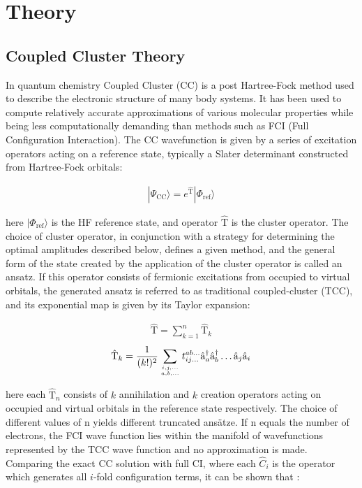 \documentclass[twoside,twocolumn,9pt]{article}
\begin{document}
\section{Theory}

\subsection{Coupled Cluster Theory}

In quantum chemistry Coupled Cluster (CC) \cite{Anand2022} is a post Hartree-Fock method used to describe the electronic structure of many body systems. It has been used to compute relatively accurate approximations of various molecular properties while being less computationally demanding than methods such as FCI (Full Configuration Interaction). The CC wavefunction is given by a series of excitation operators acting on a reference state, typically a Slater determinant constructed from Hartree-Fock orbitals:

\begin{align}
  |\Psi_{\text{CC}}\rangle = e^{\hat{\text{T}}} |\Phi_{\text{ref}}\rangle
\end{align}

here $|\Phi_{\text{ref}}\rangle$ is the HF reference state, and operator $\hat{\text{T}}$ is the cluster operator. The choice of cluster operator, in conjunction with a strategy for determining the optimal amplitudes described below, defines a given method, and the general form of the state created by the application of the cluster operator is called an ansatz. If this operator consists of fermionic excitations from occupied to virtual orbitals, the generated ansatz is referred to as traditional coupled-cluster (TCC), and its exponential map is given by its Taylor expansion:

\begin{align}
\hat{\text{T}}=\sum_{k=1}^n\hat{\text{T}}_k
\end{align}
\begin{align}
  \hat{\text{T}}_k = \frac{1}{(k\text{!})^2} \sum_{\genfrac{}{}{0pt}{}{i,j,...}{a,b,...}}t^{ab\ldots{}}_{ij\ldots{}}\hat{\text{a}}^{\dagger}_a\hat{\text{a}}^{\dagger}_b\ldots{}\hat{\text{a}}_j\hat{\text{a}}_i
\end{align}

here each $\hat{\text{T}}_n$ consists of $k$ annihilation and $k$ creation operators acting on occupied and virtual orbitals in the reference state respectively. The choice of different values of n yields different truncated ansätze. If n equals the number of electrons, the FCI wave function lies within the manifold of wavefunctions represented by the TCC wave function and no approximation is made.
Comparing the exact CC solution with full CI, where each $\hat{C}_i$ is the operator which generates all $i$-fold configuration terms, it can be shown that \cite{Bartlett2007}:
\end{document}
